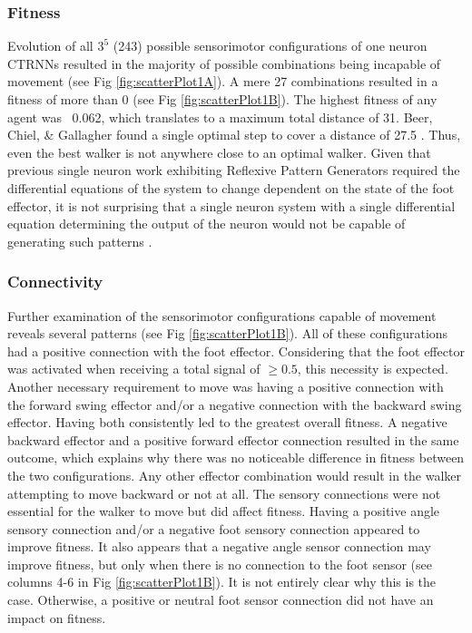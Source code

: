 \documentclass{article}
\begin{document}
\subsubsection{Fitness}
Evolution of all \(3^5\) (243) possible sensorimotor configurations of one neuron CTRNNs resulted in the majority of possible combinations being incapable of movement (see Fig \ref{fig:scatterPlot1A}). A mere 27 combinations resulted in a fitness of more than 0 (see Fig \ref{fig:scatterPlot1B}). The highest fitness of any agent was ~0.062, which translates to a maximum total distance of 31. Beer, Chiel, \& Gallagher found a single optimal step to cover a distance of 27.5 \cite{BeerOptimal}. Thus, even the best walker is not anywhere close to an optimal walker. Given that previous single neuron work exhibiting Reflexive Pattern Generators required the differential equations of the system to change dependent on the state of the foot effector, it is not surprising that a single neuron system with a single differential equation determining the output of the neuron would not be capable of generating such patterns \cite{BeerRPG}. 

\subsubsection{Connectivity}

Further examination of the sensorimotor configurations capable of movement reveals several patterns (see Fig \ref{fig:scatterPlot1B}). All of these configurations had a positive connection with the foot effector. Considering that the foot effector was activated when receiving a total signal of \(\geq 0.5\), this necessity is expected. Another necessary requirement to move was having a positive connection with the forward swing effector and/or a negative connection with the backward swing effector. Having both consistently led to the greatest overall fitness. A negative backward effector and a positive forward effector connection resulted in the same outcome, which explains why there was no noticeable difference in fitness between the two configurations. Any other effector combination would result in the walker attempting to move backward or not at all. 
The sensory connections were not essential for the walker to move but did affect fitness. Having a positive angle sensory connection and/or a negative foot sensory connection appeared to improve fitness.  
It also appears that a negative angle sensor connection may improve fitness, but only when there is no connection to the foot sensor (see columns 4-6 in Fig \ref{fig:scatterPlot1B}). It is not entirely clear why this is the case. Otherwise, a positive or neutral foot sensor connection did not have an impact on fitness.
\end{document}
